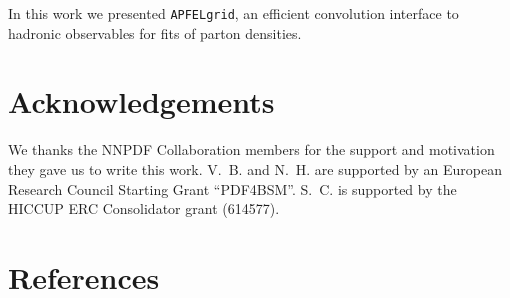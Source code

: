 \documentclass[preprint,12pt]{elsarticle}
\begin{document}
In this work we presented {\tt APFELgrid}, an efficient convolution
interface to hadronic observables for fits of parton densities.

\section*{Acknowledgements}

We thanks the NNPDF Collaboration members for the support and
motivation they gave us to write this work. V.~B. and N.~H. are
supported by an European Research Council Starting Grant ``PDF4BSM''.
S.~C. is supported by the HICCUP ERC Consolidator grant (614577).





\section*{References}








\end{document}
